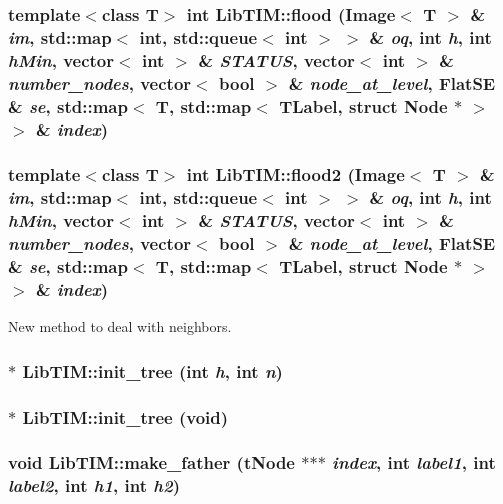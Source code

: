 \subsubsection{\setlength{\rightskip}{0pt plus 5cm}template$<$class T$>$ int Lib\-TIM::flood (Image$<$ T $>$ \& {\em im}, std::map$<$ int, std::queue$<$ int $>$ $>$ \& {\em oq}, int {\em h}, int {\em h\-Min}, vector$<$ int $>$ \& {\em STATUS}, vector$<$ int $>$ \& {\em number\_\-nodes}, vector$<$ bool $>$ \& {\em node\_\-at\_\-level}, Flat\-SE \& {\em se}, std::map$<$ T, std::map$<$ {\bf TLabel}, struct Node $\ast$ $>$ $>$ \& {\em index})}\label{group__ccTree_ga10}


\subsubsection{\setlength{\rightskip}{0pt plus 5cm}template$<$class T$>$ int Lib\-TIM::flood2 (Image$<$ T $>$ \& {\em im}, std::map$<$ int, std::queue$<$ int $>$ $>$ \& {\em oq}, int {\em h}, int {\em h\-Min}, vector$<$ int $>$ \& {\em STATUS}, vector$<$ int $>$ \& {\em number\_\-nodes}, vector$<$ bool $>$ \& {\em node\_\-at\_\-level}, Flat\-SE \& {\em se}, std::map$<$ T, std::map$<$ {\bf TLabel}, struct Node $\ast$ $>$ $>$ \& {\em index})}\label{group__ccTree_ga11}


New method to deal with neighbors. 

\subsubsection{$\ast$ Lib\-TIM::init\_\-tree (int {\em h}, int {\em n})}\label{group__ccTree_ga7}


\subsubsection{$\ast$ Lib\-TIM::init\_\-tree (void)}\label{group__ccTree_ga3}


\subsubsection{\setlength{\rightskip}{0pt plus 5cm}void Lib\-TIM::make\_\-father ({\bf t\-Node} $\ast$$\ast$$\ast$ {\em index}, int {\em label1}, int {\em label2}, int {\em h1}, int {\em h2})}\label{group__ccTree_ga2}


